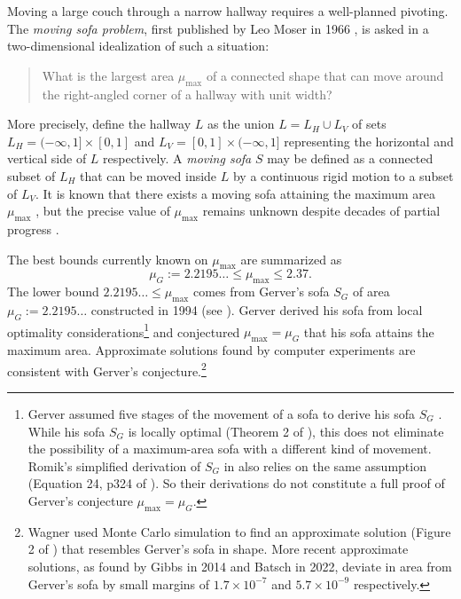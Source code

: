Moving a large couch through a narrow hallway requires a well-planned pivoting. The \emph{moving sofa problem}, first published by Leo Moser in 1966 \autocite{moser1966problem}, is asked in a two-dimensional idealization of such a situation:

\begin{quote}
What is the largest area \(\mu_{\text{max}}\) of a connected shape that can move around the right-angled corner of a hallway with unit width?
\end{quote}

More precisely, define the hallway \(L\) as the union \(L = L_H \cup L_V\) of sets \(L_H = (-\infty, 1] \times [0, 1]\) and \(L_V = [0, 1] \times (-\infty, 1]\) representing the horizontal and vertical side of \(L\) respectively. A \emph{moving sofa} \(S\) may be defined as a connected subset of \(L_H\) that can be moved inside \(L\) by a continuous rigid motion to a subset of \(L_V\). It is known that there exists a moving sofa attaining the maximum area \(\mu_{\text{max}}\) \autocite{gerverMovingSofaCorner1992,croft2012unsolved}, but the precise value of \(\mu_{\text{max}}\) remains unknown despite decades of partial progress \autocite{hammersley1968enfeeblement,gerverMovingSofaCorner1992,romikDifferentialEquationsExact2018,kallusImprovedUpperBounds2018}.

The best bounds currently known on \(\mu_{\max}\) are summarized as
\begin{equation}
\label{eqn:best-bounds}
\mu_G := 2.2195\dots \leq \mu_{\max} \leq 2.37.
\end{equation}
The lower bound \(2.2195\dots \leq \mu_{\max}\) comes from Gerver’s sofa \(S_G\) of area \(\mu_G := 2.2195\dots\) constructed in 1994 \autocite{gerverMovingSofaCorner1992} (see ). Gerver derived his sofa from local optimality considerations\footnote{Gerver assumed five stages of the movement of a sofa to derive his sofa \(S_G\) \autocite{gerverMovingSofaCorner1992}. While his sofa \(S_G\) is locally optimal (Theorem 2 of \autocite{gerverMovingSofaCorner1992}), this does not eliminate the possibility of a maximum-area sofa with a different kind of movement. Romik’s simplified derivation of \(S_G\) in \autocite{romikDifferentialEquationsExact2018} also relies on the same assumption (Equation 24, p324 of \autocite{romikDifferentialEquationsExact2018}). So their derivations do not constitute a full proof of Gerver’s conjecture \(\mu_{\max} = \mu_G\).} and conjectured \(\mu_{\max} = \mu_G\) that his sofa attains the maximum area. Approximate solutions found by computer experiments are consistent with Gerver’s conjecture.\footnote{Wagner used Monte Carlo simulation to find an approximate solution (Figure 2 of \autocite{wagner1976sofa}) that resembles Gerver’s sofa in shape. More recent approximate solutions, as found by Gibbs \autocite{gibbsComputationalStudySofas2014} in 2014 and Batsch \autocite{batschNumericalApproachAnalysing2022} in 2022, deviate in area from Gerver’s sofa by small margins of \(1.7 \times 10^{-7}\) and \(5.7 \times 10^{-9}\) respectively.}

